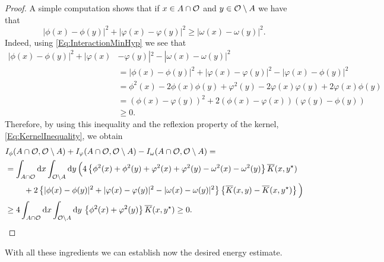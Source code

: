 \begin{proof}
A simple computation shows that if $x\in A \cap \mathcal{O} $ and $y\in \mathcal{O} \setminus A$ we have that
$$ |\phi(x)-\phi(y)|^2+|\varphi(x)-\varphi(y)|^2\geq |\omega(x)-\omega(y)|^2. $$
Indeed, using \eqref{Eq:InteractionMinHyp} we see that
\begin{align*}
|\phi(x)-\phi(y)|^2+|\varphi(x)&-\varphi(y)|^2 - |\omega(x)-\omega(y)|^2 \\
&= |\phi(x)-\phi(y)|^2+|\varphi(x)-\varphi(y)|^2 - |\varphi(x)-\phi(y)|^2 \\
&= \phi^2(x)-2\phi(x)\phi(y)+\varphi^2(y)-2\varphi(x)\varphi(y)+2\varphi(x)\phi(y) \\
&= \left( \phi(x) - \varphi(y)\right) ^2+2\left( \phi(x)-\varphi(x) \right) \left( \varphi(y)-\phi(y) \right) \\
&\geq 0.
\end{align*}
Therefore, by using this inequality and the reflexion property of the kernel, \eqref{Eq:KernelInequality}, we obtain
\begin{align*}
I_\phi(A \cap \ocal, \ocal \setminus A) &+ I_\varphi(A \cap \ocal, \ocal \setminus A) - I_\omega(A \cap \ocal, \ocal \setminus A) =\\
&\hspace{-26mm}= \int_{A \cap \ocal} \! \d x \int_{\ocal\setminus A} \! \d y \, \Big( 4\left\{\phi^2(x)+\phi^2(y)+\varphi^2(x)+\varphi^2(y)-\omega^2(x)-\omega^2(y) \right\} \overline{K}(x,y^\star) \Big.\\
&\hspace{-18mm}\Big.+  2\left\{|\phi(x)-\phi(y)|^2+|\varphi(x)-\varphi(y)|^2-|\omega(x)-\omega(y)|^2 \right\} \left\{\overline{K}(x,y)-\overline{K}(x,y^\star)\right\}\Big)\\
&\hspace{-26mm}\geq 4\int_{A \cap \ocal} \! \d x \int_{\ocal\setminus A} \! \d y \, \left\{ \phi^2(x)+\varphi^2(y)\right\} \overline{K}(x,y^\star) \geq 0.
\end{align*}
\end{proof}



With all these ingredients we can establish now the desired energy estimate.

